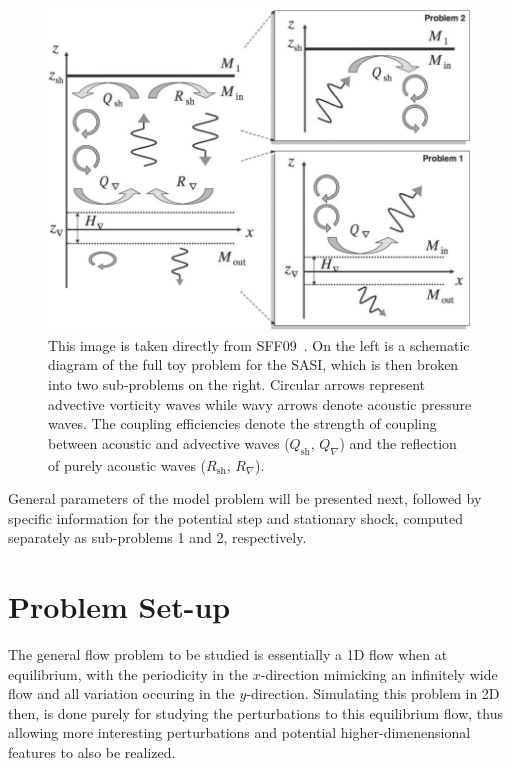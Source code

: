 \begin{figure}
\centering
\includegraphics[width=13cm]{figures/Sato1}
\caption {This image is taken directly from SFF09~\cite{Sato2009}. On the left is a schematic diagram of the full toy problem for the SASI, which is then broken into two sub-problems on the right. Circular arrows represent advective vorticity waves while wavy arrows denote acoustic pressure waves. The coupling efficiencies denote the strength of coupling between acoustic and advective waves ($Q_\textrm{sh}$, $Q_\nabla$) and the reflection of purely acoustic waves ($R_\textrm{sh}$, $R_\nabla$).}
\label{fig:Sato1}
\end{figure}

General parameters of the model problem will be presented next, followed by specific information for the potential step and stationary shock, computed separately as sub-problems 1 and 2, respectively. 


\section{Problem Set-up}
\label{sec:TP_set_up}

The general flow problem to be studied is essentially a 1D flow when at equilibrium, with the periodicity in the $x$-direction mimicking an infinitely wide flow and all variation occuring in the $y$-direction. Simulating this problem in 2D then, is done purely for studying the perturbations to this equilibrium flow, thus allowing more interesting perturbations and potential higher-dimenensional features to also be realized.

